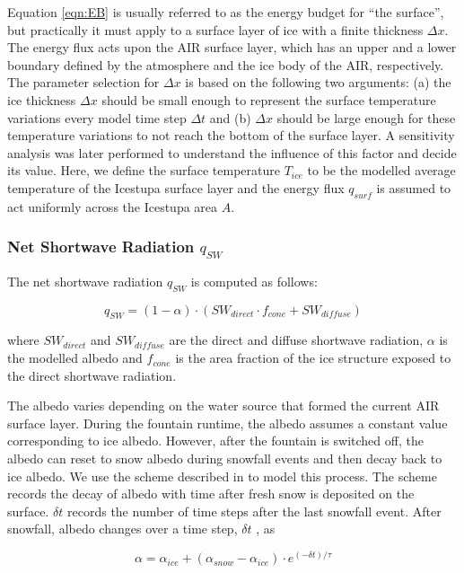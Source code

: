\documentclass[utf8]{frontiersSCNS} %
\begin{document}
Equation \ref{eqn:EB} is usually referred to as the energy budget for “the surface”, but practically it must
apply to a surface layer of ice with a finite thickness $\Delta x$. The energy flux acts upon the AIR surface
layer, which has an upper and a lower boundary defined by the atmosphere and the ice body of the AIR,
respectively. The parameter selection for $\Delta x$ is based on the following two arguments: (a) the ice
thickness $\Delta x$ should be small enough to represent the surface temperature variations every model time
step $\Delta t$ and (b) $\Delta x$ should be large enough for these temperature variations to not reach the
bottom of the surface layer. A sensitivity analysis was later performed to understand the influence of this
factor and decide its value. Here, we define the surface temperature $T_{ice}$ to be the modelled average
temperature of the Icestupa surface layer and the energy flux $q_{surf}$ is assumed to act uniformly across the
Icestupa area $A$.

\subsubsection{Net Shortwave Radiation \texorpdfstring{$q_{SW}$}{Lg}}

The net shortwave radiation $q_{SW}$ is computed as follows:

\begin{equation} q_{SW} = (1- \alpha)\cdot (SW_{direct} \cdot f_{cone} + SW_{diffuse}) \label{eqn:SW} \end{equation}

where $SW_{direct}$ and $SW_{diffuse}$ are the direct and diffuse shortwave radiation, $\alpha$ is the
modelled albedo and $f_{cone}$ is the area fraction of the ice structure exposed to the direct shortwave
radiation.

The albedo varies depending on the water source that formed the current AIR surface layer. During the fountain
runtime, the albedo assumes a constant value corresponding to ice albedo. However, after the fountain is
switched off, the albedo can reset to snow albedo during snowfall events and then decay back to ice albedo. We
use the scheme described in \cite{OerlemansKnap_1998} to model this process. The scheme records the decay of
albedo with time after fresh snow is deposited on the surface. $\delta t$ records the number of time steps after
the last snowfall event. After snowfall, albedo changes over a time step, $\delta t$ , as

\begin{equation} \alpha=\alpha_{ice}+(\alpha_{snow}-\alpha_{ice}) \cdot e^{(-\delta t)/\tau} \label{eqn:a}
\end{equation}
\end{document}

